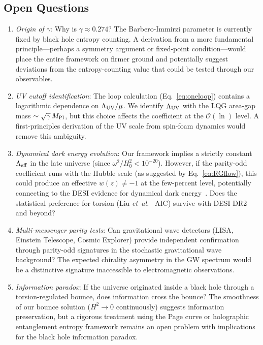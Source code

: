 \documentclass[aps,prd,twocolumn,superscriptaddress,showpacs,preprintnumbers,nofootinbib,longbibliography,floatfix]{revtex4-2}
\newcommand{\Leff}{\Lambda_{\rm eff}}
\newcommand{\MPl}{M_{\rm Pl}}
\newcommand{\etal}{\textit{et~al.}}
\begin{document}
\subsection{Open Questions}

\begin{enumerate}[leftmargin=*]
\item \textit{Origin of $\gamma$}: Why is $\gamma \approx 0.274$? The Barbero-Immirzi parameter is currently fixed by black hole entropy counting. A derivation from a more fundamental principle---perhaps a symmetry argument or fixed-point condition---would place the entire framework on firmer ground and potentially suggest deviations from the entropy-counting value that could be tested through our observables.

\item \textit{UV cutoff identification}: The loop calculation (Eq.~\ref{eq:oneloop}) contains a logarithmic dependence on $\Lambda_{\rm UV}/\mu$. We identify $\Lambda_{\rm UV}$ with the LQG area-gap mass $\sim\sqrt{\gamma}\,\MPl$, but this choice affects the coefficient at the $\mathcal{O}(\ln)$ level. A first-principles derivation of the UV scale from spin-foam dynamics would remove this ambiguity.

\item \textit{Dynamical dark energy evolution}: Our framework implies a strictly constant $\Leff$ in the late universe (since $\omega^2/H_0^2 < 10^{-20}$). However, if the parity-odd coefficient runs with the Hubble scale (as suggested by Eq.~\ref{eq:RGflow}), this could produce an effective $w(z) \neq -1$ at the few-percent level, potentially connecting to the DESI evidence for dynamical dark energy~\cite{DESI2024,DESI2025DR2}. Does the statistical preference for torsion (Liu \etal~\cite{Liu2025} AIC) survive with DESI DR2 and beyond?

\item \textit{Multi-messenger parity tests}: Can gravitational wave detectors (LISA, Einstein Telescope, Cosmic Explorer) provide independent confirmation through parity-odd signatures in the stochastic gravitational wave background? The expected chirality asymmetry in the GW spectrum would be a distinctive signature inaccessible to electromagnetic observations.

\item \textit{Information paradox}: If the universe originated inside a black hole through a torsion-regulated bounce, does information cross the bounce? The smoothness of our bounce solution ($H^2 \to 0$ continuously) suggests information preservation, but a rigorous treatment using the Page curve or holographic entanglement entropy framework remains an open problem with implications for the black hole information paradox.


\end{enumerate}
\end{document}
